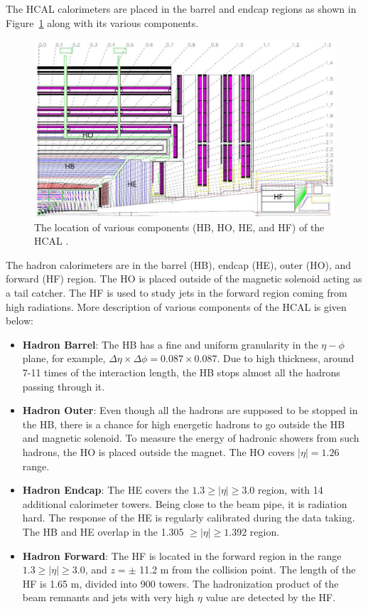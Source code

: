 The HCAL calorimeters are placed in the barrel and endcap regions as shown in
Figure~\ref{fig:cms_hcal_pos} along with its various components. 
\begin{figure}
  \begin{center}
  \includegraphics[width=0.75\linewidth]{Experiment/CMS/Image/HCAL/hcal.png}
	  \caption{The location of various components (HB, HO, HE, and HF) of 
	  the HCAL \cite{Isildak:2013kfa}.}
  \label{fig:cms_hcal_pos}
  \end{center}
\end{figure}
The hadron calorimeters are in the barrel (HB), endcap (HE), outer (HO), and 
forward (HF) region. The HO is placed outside of the magnetic solenoid acting
as a tail catcher. The HF is used to study jets in the forward region coming
from high radiations. More description of various components of the HCAL is given below:
\begin{itemize}[leftmargin=*]
  \item \textbf{Hadron Barrel}:
	The HB has a fine and uniform granularity in the $\eta-\phi$ plane, 
	for example, $\Delta\eta\times\Delta\phi = 0.087\times 0.087$.
	Due to high thickness, around 7-11 times of the interaction length,
	the HB stops almost all the hadrons passing through it.
  \item \textbf{Hadron Outer}:
	Even though all the hadrons are supposed to be stopped in the HB, there
	is a chance for high energetic hadrons to go outside the HB and magnetic
	solenoid. To measure the energy of hadronic showers from such hadrons,
	the HO is placed outside the magnet. The HO covers $|\eta| = 1.26$ range. 
  \item \textbf{Hadron Endcap}: The HE covers the $1.3\geq |\eta|\geq 3.0$
	region, with 14 additional calorimeter towers. Being close to the beam
	pipe, it is radiation hard. The response of the HE is regularly 
	calibrated during the data taking. The HB and HE overlap in the 
	1.305 $\geq |\eta| \geq 1.392$ region.
  \item \textbf{Hadron Forward}: The HF is located in the forward region
	in the range $1.3\geq |\eta| \geq 3.0$, and $z = \pm$ 11.2 m from the
	collision point. The length of the HF is 1.65 m, divided into 900 towers.
	The hadronization product of the beam remnants and jets with very high
	$\eta$ value are detected by the HF.
\end{itemize}

